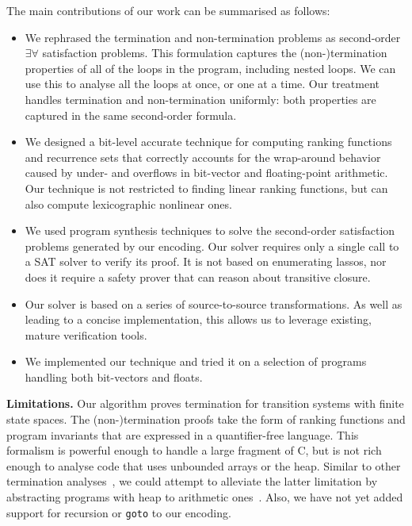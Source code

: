 \documentclass[preprint]{sigplanconf}
\theoremstyle{definition}
\begin{document}
The main contributions of our work can be summarised as follows:
%
\begin{itemize}

\item  We rephrased the termination and non-termination problems as
second-order $\exists \forall$ satisfaction problems.  This formulation
captures the (non-)termination
properties of all of the loops in the program, including
nested loops.  We can use this to analyse all the loops at once,
or one at a time.  Our treatment handles termination and non-termination uniformly:
both properties are captured in the same second-order formula.	

\item We designed a bit-level accurate technique for computing ranking
functions and recurrence sets that correctly accounts for the wrap-around
behavior caused by under- and overflows in bit-vector and floating-point arithmetic.  Our
technique is not restricted to finding linear ranking functions, but can
also compute lexicographic nonlinear ones.



\item We used program synthesis techniques to solve the second-order satisfaction
problems generated by our encoding.  Our solver requires only a single call to a SAT solver to verify its
proof.  It is not based on enumerating lassos, nor does it require a safety prover
that can reason about transitive closure.



\item Our solver is based on a series of source-to-source
transformations.  As well as leading to a concise implementation, this
allows us to leverage existing, mature verification tools.

\item We implemented our technique and tried it on a selection of programs
handling both bit-vectors and floats.

\end{itemize} 

{\bf Limitations.} Our algorithm proves termination for transition systems
with finite state spaces.  The (non-)termination proofs take the form of
ranking functions and program invariants that are expressed in a
quantifier-free language.  This formalism is powerful enough to handle a
large fragment of C, but is not rich enough to analyse code that uses
unbounded arrays or the heap.  Similar to other termination
analyses~\cite{DBLP:conf/tacas/CookSZ13}, we could attempt to alleviate the
latter limitation by abstracting programs with heap to arithmetic
ones~\cite{DBLP:conf/popl/MagillTLT10}.  Also, we have not yet added support
for recursion or \texttt{goto} to our encoding.
\end{document}

